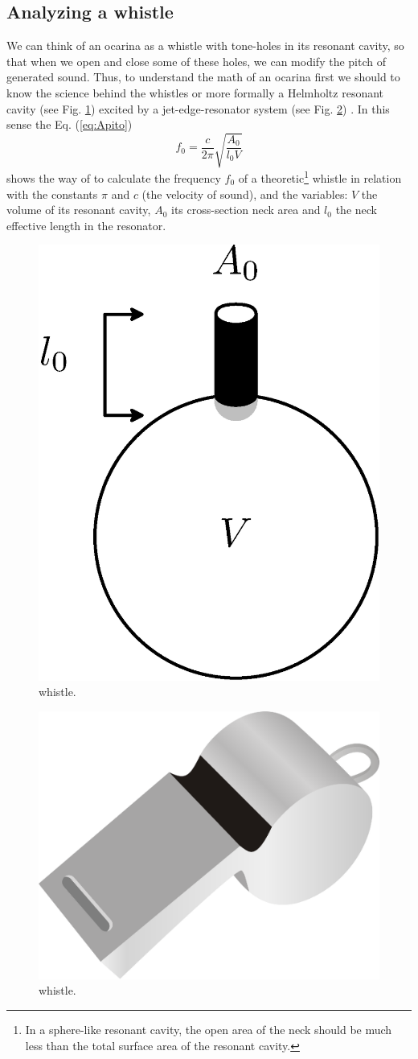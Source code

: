\documentclass[11pt,twocolumn]{article}
\begin{document}
\subsection{Analyzing a whistle}
We can think of an ocarina as a whistle with tone-holes in its resonant cavity,
so that when we open and close some of these holes, we can modify the pitch of generated sound.
Thus, to understand the math of an ocarina first we should to know the science behind the whistles  
or more formally a Helmholtz resonant cavity \cite{corning2011resonance} (see Fig. \ref{fig:resonador}) excited by a jet-edge-resonator system (see Fig. \ref{football-referee-whistle}) \cite[pp. 3]{gibiat2013acoustic} \cite[pp. 138]{nyborg1953characteristics}. 
In this sense the Eq. (\ref{eq:Apito}) 
\begin{equation} 
\label{eq:Apito}
 f_0 = \frac{c}{2 \pi} \sqrt{\frac{A_{0}}{l_{0}V} }  
\end{equation}
shows the way of to calculate the frequency $f_0$ of a theoretic\footnote{In  a sphere-like resonant cavity, the open area of the neck should be much less than the total surface area of the resonant cavity.} whistle \cite[pp. 3]{gibiat2013acoustic} \cite[pp. 5]{kobayashi20093d} \cite[pp. 265]{okadanumerical}
in relation with the constants $\pi$  and $c$ (the velocity of sound), and 
the variables: $V$ the volume of its resonant cavity,
$A_0$ its cross-section neck area and $l_0$ the neck effective length in the resonator.


\begin{figure}[ht!]
\centering
\includegraphics[width=0.350\columnwidth]{resonador.eps}
\caption{whistle. }
\label{fig:resonador}
\end{figure}

\begin{figure}[ht!]
\centering
\includegraphics[width=0.250\columnwidth]{football-referee-whistle.eps}
\caption{whistle. }
\label{football-referee-whistle}
\end{figure}
\end{document}
